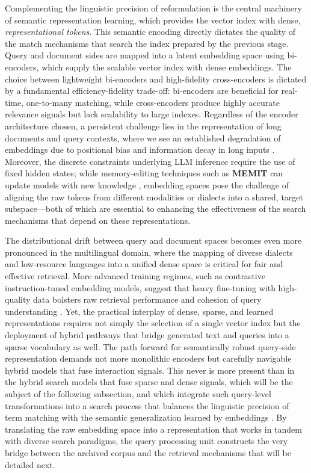 \documentclass[11pt,a4paper]{article}
\begin{document}
Complementing the linguistic precision of reformulation is the central machinery of semantic representation learning, which provides the vector index with dense, \emph{representational tokens}. This semantic encoding directly dictates the quality of the match mechanisms that search the index prepared by the previous stage. Query and document sides are mapped into a latent embedding space using bi-encoders, which supply the scalable vector index with dense embeddings. The choice between lightweight bi-encoders and high-fidelity cross-encoders is dictated by a fundamental efficiency-fidelity trade-off: bi-encoders are beneficial for real-time, one-to-many matching, while cross-encoders produce highly accurate relevance signals but lack scalability to large indexes. Regardless of the encoder architecture chosen, a persistent challenge lies in the representation of long documents and query contexts, where we see an established degradation of embeddings due to positional bias and information decay in long inputs \cite{arxiv:2405.17428v1}. Moreover, the discrete constraints underlying LLM inference require the use of fixed hidden states; while memory-editing techniques such as \textbf{MEMIT} can update models with new knowledge \cite{arxiv:2210.07229v2}, embedding spaces pose the challenge of aligning the raw tokens from different modalities or dialects into a shared, target subspace---both of which are essential to enhancing the effectiveness of the search mechanisms that depend on these representations.

The distributional drift between query and document spaces becomes even more pronounced in the multilingual domain, where the mapping of diverse dialects and low-resource languages into a unified dense space is critical for fair and effective retrieval. More advanced training regimes, such as contrastive instruction-tuned embedding models, suggest that heavy fine-tuning with high-quality data bolsters raw retrieval performance and cohesion of query understanding \cite{arxiv:2405.17428v1}. Yet, the practical interplay of dense, sparse, and learned representations requires not simply the selection of a single vector index but the deployment of hybrid pathways that bridge generated text and queries into a sparse vocabulary as well. The path forward for semantically robust query-side representation demands not more monolithic encoders but carefully navigable hybrid models that fuse interaction signals. This never is more present than in the hybrid search models that fuse sparse and dense signals, which will be the subject of the following subsection, and which integrate such query-level transformations into a search process that balances the linguistic precision of term matching with the semantic generalization learned by embeddings \cite{arxiv:2308.07107v3}. By translating the raw embedding space into a representation that works in tandem with diverse search paradigms, the query processing unit constructs the very bridge between the archived corpus and the retrieval mechanisms that will be detailed next.
\end{document}
